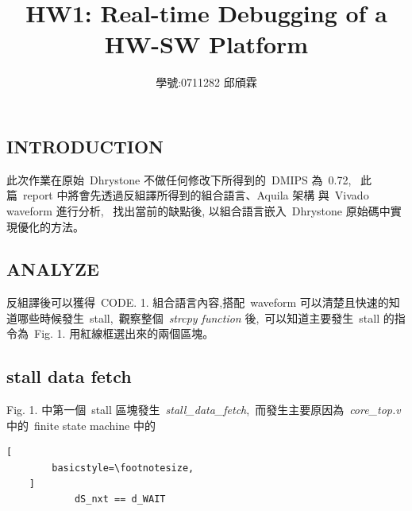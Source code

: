 \documentclass{article}
\title{\Large {HW1: Real-time Debugging of a HW-SW Platform}}
\author{學號:0711282 邱頎霖}
\date{}
\begin{document}
\begin{CJK*}{UTF8}{bsmi}
\setlength{\columnsep}{1cm}

\vspace*{-90pt}
    {\let\newpage\relax\maketitle}

\begin{multicols}{2}

\begin{center}
    \section*{INTRODUCTION}
\end{center}

\begin{flushleft}
    此次作業在原始\ Dhrystone 不做任何修改下所得到的\ DMIPS 為\ 0.72, \
    此篇\ report 中將會先透過反組譯所得到的組合語言、Aquila 架構 與\ Vivado waveform 進行分析, \ 
    找出當前的缺點後, 以組合語言嵌入\ Dhrystone 原始碼中實現優化的方法。 
\end{flushleft}

\begin{center}
    \section*{ANALYZE}
\end{center}
\begin{flushleft}
反組譯後可以獲得\ CODE. 1. 組合語言內容,搭配\ waveform 可以清楚且快速的知道哪些時候發生\ stall,\
觀察整個\ \textit{strcpy function} 後,\
可以知道主要發生\ stall 的指令為\ Fig. 1. 用紅線框選出來的兩個區塊。\newline
\end{flushleft}

\begin{center}
    \subsection*{stall data fetch}
\end{center}
\begin{flushleft}
Fig. 1. 中第一個\ stall 區塊發生\ \textit{stall\_data\_fetch},\ 
而發生主要原因為\ \textit{core\_top.v} 中的\ finite state machine 中的
\end{flushleft}

\begin{center}
    \begin{lstlisting}[
        basicstyle=\footnotesize, 
    ]
            dS_nxt == d_WAIT
    \end{lstlisting}
\end{center}


\end{multicols}
\end{CJK*}
\end{document}
